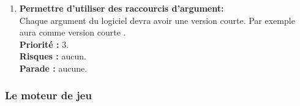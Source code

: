 \begin{enumerate}
    \item \textbf{Permettre d'utiliser des raccourcis d'argument:} \\ 
    Chaque argument du logiciel devra avoir une version courte. Par exemple  aura comme version courte . \\
    \textbf{Priorité :} 3. \\
    \textbf{Risques :} aucun. \\
    \textbf{Parade :} aucune.

\end{enumerate}


\subsubsection{Le moteur de jeu}
\label{sec:engine}

